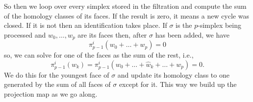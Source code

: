 \documentclass[../main.tex]{subfiles}
\begin{document}
So then we loop over every simplex stored in the filtration and compute the sum of the
homology classes of its faces. If the result is zero, it means a new cycle was closed. If
it is not then an identification takes place. If \( \sigma \) is the \( p \)-simplex being
processed and \( w_0, \dots, w_p \) are its faces then, after \( \sigma \) has been added,
we have
\begin{equation*}
	\pi_{p-1}^i(w_0 + \dots + w_p) = 0
\end{equation*}
so, we can solve for one of the faces as the sum of the rest, i.e.,
\begin{equation*}
	\pi_{p-1}^i(w_k) = \pi_{p-1}^i(w_0 + \dots + \hat{w}_k + \dots + w_p) = 0.
\end{equation*}
We do this for the youngest face of \( \sigma \) and update its homology class to one
generated by the sum of all faces of \( \sigma \) except for it. This way we build up the
projection map as we go along. 
\end{document}
